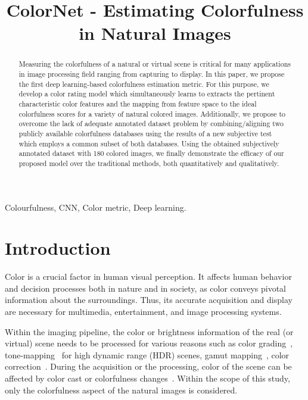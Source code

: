 \documentclass{article}
\title{ColorNet - Estimating Colorfulness in Natural Images}
\begin{document}
\ninept
\maketitle
\begin{abstract}


Measuring the colorfulness of a natural or virtual scene is critical for many applications in image processing field ranging from capturing to display. In this paper, we propose the first deep learning-based colorfulness estimation metric. For this purpose, we develop a color rating model which simultaneously learns to extracts the pertinent characteristic color features and the mapping from feature space to the ideal colorfulness scores for a variety of natural colored images. Additionally, we propose to overcome the lack of adequate annotated dataset problem by combining/aligning two publicly available colorfulness databases using the results of a new subjective test which employs a common subset of both databases. Using the obtained subjectively annotated dataset with 180 colored images, we finally demonstrate the efficacy of our proposed model over the traditional methods, both quantitatively and qualitatively.
\end{abstract}
\begin{keywords}
Colourfulness, CNN, Color metric, Deep learning.
\end{keywords}




\section{Introduction}
\label{sec:intro}

Color is a crucial factor in human visual perception. It affects human behavior and decision processes both in nature and in society, as color conveys pivotal information about the surroundings. Thus, its accurate acquisition and display are necessary for multimedia, entertainment, and image processing systems. 

Within the imaging pipeline, the color or brightness information of the real (or virtual) scene needs to be processed for various reasons such as color grading~\cite{pitie2007automated}, tone-mapping~\cite{mantiuk2008display} for high dynamic range (HDR) scenes, gamut mapping~\cite{sikudova2016gamut}, color correction~\cite{mantiuk2009color}. During the acquisition or the processing, color of the scene can be affected by color cast or colorfulness changes~\cite{hasler2003measuring}. Within the scope of this study, only the colorfulness aspect of the natural images is considered.
\end{document}

